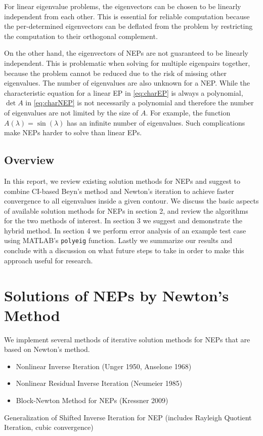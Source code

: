 \documentclass[11pt,letterpaper]{article}
\begin{document}
For linear eigenvalue problems, the eigenvectors can be chosen to be linearly independent from each other. This is essential for reliable computation because the per-determined eigenvectors can be deflated from the problem by restricting the computation to their orthogonal complement. 

On the other hand, the eigenvectors of NEPs are not guaranteed to be linearly independent. This is problematic when solving for multiple eigenpairs together, because the problem cannot be reduced due to the risk of missing other eigenvalues. The number of eigenvalues are also unknown for a NEP. While the characteristic equation for a linear EP in \ref{eq:charEP} is always a polynomial, $\det A$ in \ref{eq:charNEP} is not necessarily a polynomial and therefore the number of eigenvalues are not limited by the size of $A$. For example, the function $ A(\lambda) = \sin(\lambda) $ has an infinite number of eigenvalues. Such complications make NEPs harder to solve than linear EPs. 

\subsection{Overview}
In this report, we review existing solution methods for NEPs and suggest to combine CI-based Beyn's method and Newton's iteration to achieve faster convergence to all eigenvalues inside a given contour. We discuss the basic aspects of available solution methods for NEPs in section 2, and review the algorithms for the two methods of interest. In section 3 we suggest and demonstrate the hybrid method. In section 4 we perform error analysis of an example test case using MATLAB's {\tt polyeig} function. Lastly we summarize our results and conclude with a discussion on what future steps to take in order to make this approach useful for research. 

\pagebreak
\section{Solutions of NEPs by Newton's Method }
We implement several methods of iterative solution methods for NEPs that are based on Newton's method. 
\begin{itemize}
\item Nonlinear Inverse Iteration (Unger 1950, Anselone 1968)
\item Nonlinear Residual Inverse Iteration (Neumeier 1985)
\item Block-Newton Method for NEPs (Kressner 2009)
\end{itemize}
Generalization of Shifted Inverse Iteration for NEP (includes Rayleigh Quotient Iteration, cubic convergence) \\
\end{document}
